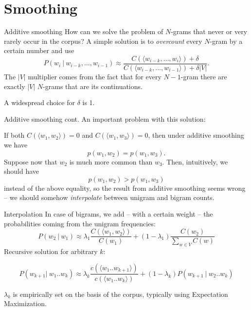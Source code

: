\documentclass[style=upen, size=14pt]{powerdot}
\theoremstyle{definition}
\begin{document}
\section{Smoothing}

\begin{slide}[toc=Additive smoothing]{Additive smoothing}
  How can we solve the problem of $N$-grams that never or very rarely occur in
  the corpus? A simple solution is to \emph{overcount} every $N$-gram by a certain
  number and use
    $$
    P(w_{i} ~\vert~ w_{i-k},\dots,w_{i-1}) \approx \frac{C(\langle
      w_{i-k},\dots,w_{i}\rangle)+\delta}{C(\langle w_{i-k},\dots,w_{i-1}
      \rangle) + \delta|V|}.
    $$
  The $|V|$ multiplier comes from the fact that for every $N-1$-gram there are
  exactly $|V|$ $N$-grams that are its continuations.\bigskip

  A widespread choice for $\delta$ is 1.
\end{slide}

\begin{slide}[toc=]{Additive smoothing cont.}
  An important problem with this solution:

  If both $C(\langle w_1,w_2\rangle)=0$ and $C(\langle w_1,w_3\rangle)=0$, then under
  additive smoothing we have 
  $$ p(w_1,w_2)=p(w_1,w_3).$$
  Suppose now that $w_2$ is much more common than $w_3$. Then, intuitively, we
  should have 
  $$ p(w_1,w_2)>p(w_1,w_3)$$
  instead of the above equality, so the result from additive smoothing seems
  wrong -- we should somehow \emph{interpolate} between unigram and bigram
  counts.
\end{slide}

\begin{slide}[toc=Interpolation]{Interpolation}
  In case of bigrams, we add -- with a certain weight -- the probabilities coming
  from the unigram frequencies:
$$P(w_2 ~\vert ~w_1) \approx \lambda_1\frac{C(\langle w_1, w_2 \rangle)}{C(w_1)} + (1 - \lambda_1)\frac{C(w_2)}{\sum_{w\in V}C(w)}$$
Recursive solution for arbitrary $k$:
\begin{small}
$$P(w_{k+1} \vert~ w_1.. w_k) \approx \lambda_k\frac{c(\langle w_1 .. w_{k+1} \rangle)}{c(\langle w_1 .. w_k\rangle)} + (1-\lambda_k)P(w_{k+1} ~\vert~ w_2 .. w_{k})$$
\end{small}
$\lambda_k$ is empirically set on the basis of the corpus, typically using
Expectation Maximization.


\end{slide}
\end{document}
